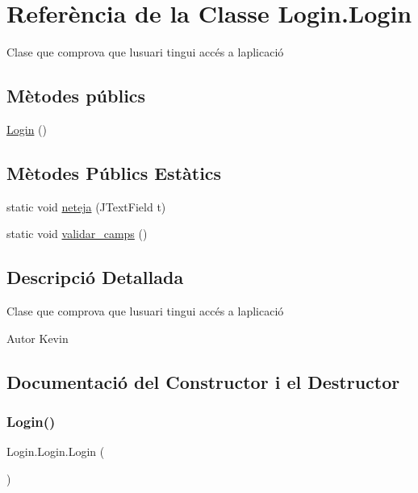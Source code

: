 \hypertarget{class_login_1_1_login}{}\section{Referència de la Classe Login.\+Login}
\label{class_login_1_1_login}


Clase que comprova que l\textquotesingle{}usuari tingui accés a l\textquotesingle{}aplicació  


\subsection*{Mètodes públics}
\begin{DoxyCompactItemize}
\item 
\mbox{\hyperlink{class_login_1_1_login_a685e9c305b50efcb21f02403e88a9878}{Login}} ()
\end{DoxyCompactItemize}
\subsection*{Mètodes Públics Estàtics}
\begin{DoxyCompactItemize}
\item 
static void \mbox{\hyperlink{class_login_1_1_login_ab9a57c87d4e69a7e680e73d3f6493f93}{neteja}} (J\+Text\+Field t)
\item 
static void \mbox{\hyperlink{class_login_1_1_login_a206a680beeee1f655925c36eeceb231e}{validar\+\_\+camps}} ()
\end{DoxyCompactItemize}


\subsection{Descripció Detallada}
Clase que comprova que l\textquotesingle{}usuari tingui accés a l\textquotesingle{}aplicació 

\begin{DoxyAuthor}{Autor}
Kevin 
\end{DoxyAuthor}


\subsection{Documentació del Constructor i el Destructor}
\mbox{\label{class_login_1_1_login_a685e9c305b50efcb21f02403e88a9878}} 
\subsubsection{\texorpdfstring{Login()}{Login()}}
{\footnotesize\ttfamily Login.\+Login.\+Login (\begin{DoxyParamCaption}{ }\end{DoxyParamCaption})}

